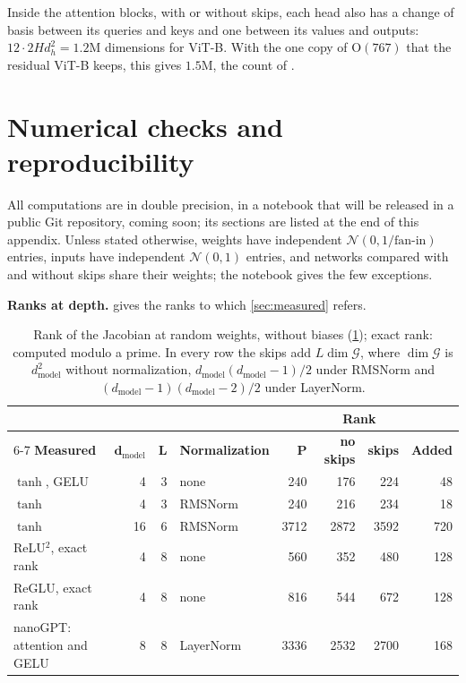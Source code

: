 \documentclass[10pt]{article}
\theoremstyle{definition}
\theoremstyle{remark}
\newcommand{\dm}{d_{\mathrm{model}}}
\newcommand{\Ort}{\mathrm{O}}
\newcommand{\G}{\mathcal{G}}
\newcommand{\para}[1]{\smallskip\noindent\textbf{#1}\hspace{0.5em}}
\begin{document}
Inside the attention blocks, with or without skips, each head also has a change of basis between its queries and keys and one between its values and outputs: $12 \cdot 2Hd_h^2 = 1.2$M dimensions for ViT-B. With the one copy of $\Ort(767)$ that the residual ViT-B keeps, this gives $1.5$M, the count of \citet[Eq.~17]{vannierop2024gauge}.


\FloatBarrier
\section{Numerical checks and reproducibility}\label{app:checks}

All computations are in double precision, in a notebook that will be released in a public Git repository, coming soon; its sections are listed at the end of this appendix. Unless stated otherwise, weights have independent $\mathcal N(0, 1/\text{fan-in})$ entries, inputs have independent $\mathcal N(0, 1)$ entries, and networks compared with and without skips share their weights; the notebook gives the few exceptions.

\para{Ranks at depth.}  gives the ranks to which \cref{sec:measured} refers.

\begin{table}[ht]
\centering\small
\renewcommand{\arraystretch}{1.1}
\begin{tabular}{@{}lrrlrrrr@{}}
\toprule
& & & & & \multicolumn{2}{c}{\textbf{Rank}} & \\
\cmidrule(lr){6-7}
\textbf{Measured} & $\boldsymbol{\dm}$ & $\boldsymbol{L}$ & \textbf{Normalization} & $\boldsymbol{P}$ & \textbf{no skips} & \textbf{skips} & \textbf{Added} \\
\midrule
$\tanh$, GELU & 4 & 3 & none & 240 & 176 & 224 & 48 \\
$\tanh$ & 4 & 3 & RMSNorm & 240 & 216 & 234 & 18 \\
$\tanh$ & 16 & 6 & RMSNorm & 3712 & 2872 & 3592 & 720 \\
ReLU$^2$, exact rank & 4 & 8 & none & 560 & 352 & 480 & 128 \\
ReGLU, exact rank & 4 & 8 & none & 816 & 544 & 672 & 128 \\
nanoGPT: attention and GELU & 8 & 8 & LayerNorm & 3336 & 2532 & 2700 & 168 \\
\bottomrule
\end{tabular}
\caption{Rank of the Jacobian at random weights, without biases (\cref{app:checks}); exact rank: computed modulo a prime. In every row the skips add $L\dim\G$, where $\dim\G$ is $\dm^2$ without normalization, $\dm(\dm-1)/2$ under RMSNorm and $(\dm-1)(\dm-2)/2$ under LayerNorm.}
\label{tab:measured}
\end{table}
\end{document}

